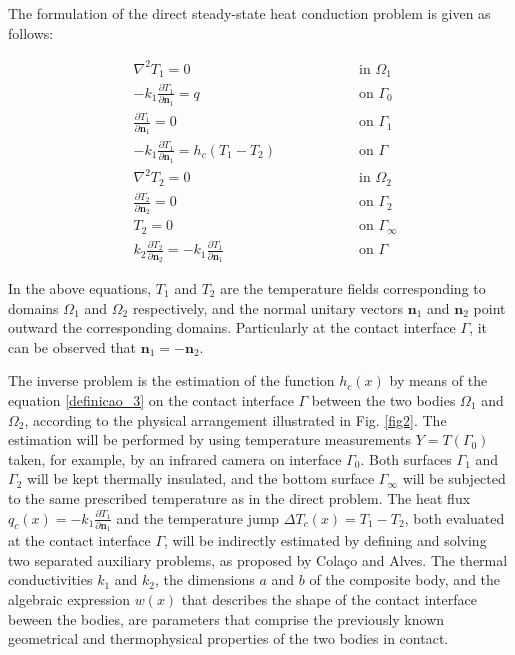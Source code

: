 \documentclass[conference,compsoc,fleqn]{IEEEtran}
\begin{document}
The formulation of the direct steady-state heat conduction problem is given as follows:

\begin{subequations}
	\begin{alignat}{2}
		& \nabla^2 T_1 = 0 \quad\quad\quad\quad && \text{ in } \Omega_1 \label{harm_T1} \\ 
		& -k_1 \frac{\partial T_1}{\partial\mathbf{n}_1} = q && \text{ on } \Gamma_0  \label{cc_T1_2} \\ 
		& \frac{\partial T_1}{\partial \mathbf{n}_1} = 0 && \text{ on }  \Gamma_1 \label{cc_T1_1} \\ 
		& -k_1 \frac{\partial T_1}{\partial\mathbf{n}_1} = h_c(T_1-T_2) \quad\quad\quad\quad && \text{ on }  \Gamma \label{cc_grad_T1} \\ 
		& \nabla^2 T_2 = 0 && \text{ in }  \Omega_2 \label{harm_T2} \\ 
		& \frac{\partial T_2}{\partial \mathbf{n}_2} = 0 && \text{ on }  \Gamma_2 \label{cc_T1_3} \\
		& T_2 = 0 && \text{ on }  \Gamma_\infty \label{cc_T1_4} \\ 
		& k_2\frac{\partial T_2}{\partial\mathbf{n}_2} = - k_1\frac{\partial T_1}{\partial\mathbf{n}_1} && \text{ on }  \Gamma \label{cc_T1_5}
	\end{alignat}
\end{subequations}

In the above equations, $T_1$ and $T_2$ are the temperature fields corresponding to domains $\Omega_1$ and $\Omega_2$ respectively, and the normal unitary vectors $\mathbf{n}_1$ and $\mathbf{n}_2$ point outward the corresponding domains. Particularly at the contact interface $\Gamma$, it can be observed that $\mathbf{n}_1 = -\mathbf{n}_2$.
\\


The inverse problem is the estimation of the function $h_c(x)$ by means of the equation \eqref{definicao_3} on the contact interface $\Gamma$ between the two bodies $\Omega_1$ and $\Omega_2$, according to the physical arrangement illustrated in Fig. \ref{fig2}. The estimation will be performed by using temperature measurements $Y = T(\Gamma_0)$ taken, for example, by an infrared camera on interface $\Gamma_0$. Both surfaces $\Gamma_1$ and $\Gamma_2$ will be kept thermally insulated, and the bottom surface $\Gamma_\infty$ will be subjected to the same prescribed temperature as in the direct problem. The heat flux $q_c(x) = -k_1\frac{\partial T_1}{\partial \mathbf{n}_1}$ and the temperature jump $\Delta T_c(x) = T_1 - T_2$, both evaluated at the contact interface $\Gamma$, will be indirectly estimated by defining and solving two separated auxiliary problems, as proposed by Colaço and Alves\cite{reciproc_3}. The thermal conductivities $k_1$ and $k_2$, the dimensions $a$ and $b$ of the composite body, and the algebraic expression $w(x)$ that describes the shape of the contact interface beween the bodies, are parameters that comprise the previously known geometrical and thermophysical properties of the two bodies in contact.
\\
\end{document}
